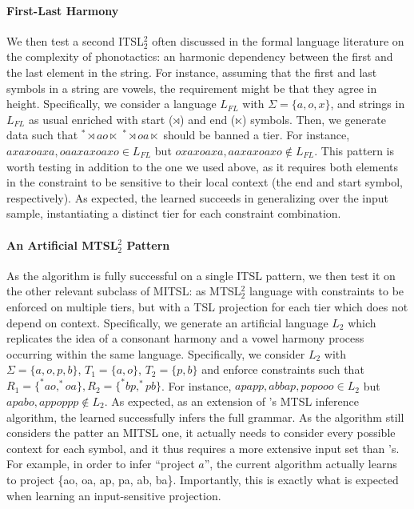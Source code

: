 \documentclass[11pt,a4paper]{article}
\begin{document}
\paragraph{First-Last Harmony}
We then test a second ITSL$^2_2$ often discussed in the formal language literature on the complexity of phonotactics: an harmonic dependency between the first and the last element in the string.
For instance, assuming that the first and last symbols in a string are vowels, the requirement might be that they agree in height.
Specifically, we consider a language $L_{FL}$ with $\Sigma =\{ a, o, x\}$, and strings in$L_{FL}$  as usual enriched with start ($\rtimes$) and end ($\ltimes$) symbols.
Then, we generate data such that $^*\rtimes ao\ltimes$ $^*\rtimes oa\ltimes$ should be banned a tier.
For instance, $axaxoaxa, oaaxaxoaxo \in L_{FL}$ but  $oxaxoaxa, aaxaxoaxo \notin L_{FL}$.
This pattern is worth testing in addition to the one we used above, as it requires both elements in the constraint to be sensitive to their local context (the end and start symbol, respectively).
As expected, the learned succeeds in generalizing over the input sample, instantiating a distinct tier for each constraint combination.



\paragraph{An Artificial MTSL$^2_2$ Pattern} As the algorithm is fully successful on a single ITSL pattern, we then test it on the other relevant subclass of MITSL: as MTSL$^2_2$ language with constraints to be enforced on multiple tiers, but with a TSL projection for each tier which does not depend on context.
Specifically, we generate an artificial language $L_2$ which replicates the idea of a consonant harmony and a vowel harmony process occurring within the same language.
Specifically, we consider  $L_2$ with $\Sigma = \{a, o, p, b\}$, $T_1=\{a,o\}$, $T_2=\{p,b\}$ and enforce constraints such that $R_1 = \{^*ao, ^*oa\}, R_2= \{^*bp, ^*pb\}$.
For instance, $apapp, abbap, popooo \in L_2$ but  $apabo, appoppp \notin L_2$.
As expected, as an extension of  \citet{McMullinSCIL2019}'s MTSL inference algorithm, the learned successfully infers the full grammar.
As the algorithm still considers the patter an MITSL one, it actually needs to consider every possible context for each symbol, and it thus requires a more extensive input set than \citet{McMullinSCIL2019}'s.
For example, in order to infer ``project $a$'', the current algorithm actually learns to project \{ao, oa, ap, pa, ab, ba\}.
Importantly, this is exactly what is expected when learning an input-sensitive projection.
\end{document}
